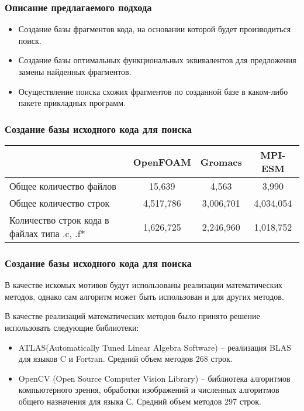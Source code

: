 \documentclass{beamer}
\begin{document}
\begin{frame}
\frametitle{Описание предлагаемого подхода}
\begin{itemize}
	\item Создание базы фрагментов кода, на основании которой будет производиться поиск.
	\item Создание базы оптимальных функциональных эквивалентов для предложения замены найденных фрагментов.
	\item Осуществление поиска схожих фрагментов по созданной базе в каком-либо пакете
прикладных программ.
\end{itemize}
\end{frame}

\begin{frame}
\frametitle{Создание базы исходного кода для поиска}
\renewcommand{\arraystretch}{1.8} %
\begin{tabular}{|p{3.8cm}|c|c|c|}
\hline
 & OpenFOAM &  Gromacs & MPI-ESM\\
\hline
Общее количество
\newline файлов & 15,639 & 4,563 & 3,990\\
\hline
Общее количество строк & 4,517,786 & 3,006,701 & 4,034,054 \\
\hline
Количество строк  кода
\newline в файлах типа .c, .f* & 1,626,725 & 2,246,960 & 1,018,752\\
\hline
\end{tabular}
\end{frame}

\begin{frame}
\frametitle{Создание базы исходного кода для поиска}
В качестве искомых мотивов будут использованы реализации математических методов,
 однако сам алгоритм может быть использован и для других методов. 

В качестве реализаций математических методов было принято решение использовать
 следующие библиотеки: 
\begin{itemize}
	\item ATLAS(Automatically Tuned Linear Algebra Software) -- реализация BLAS для
	 языков C и Fortran. Средний объем методов 268 строк.
	\item OpenCV (Open Source Computer Vision Library) -- библиотека алгоритмов
	 компьютерного зрения, обработки изображений и численных алгоритмов общего
	  назначения  для языка С. Средний объем методов 297 строк.
\end{itemize}
\end{frame}
\end{document}
